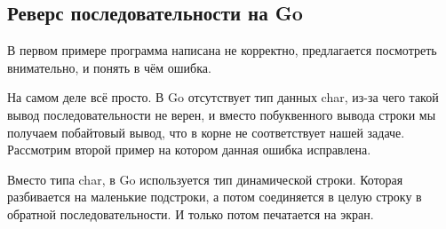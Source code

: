 \documentclass[a4paper, 12pt, titlepage, finall]{extreport}
\begin{document}
        \subsection{Реверс последовательности на Go}
            В первом примере программа написана не корректно, предлагается посмотреть внимательно, и понять в чём ошибка.
            
            
            На самом деле всё просто. В Go отсутствует тип данных char, из-за чего такой вывод последовательности не верен, и вместо
            побуквенного вывода строки мы получаем побайтовый вывод, что в корне не соответствует нашей задаче.
            Рассмотрим второй пример на котором данная ошибка исправлена.
            
            
            Вместо типа char, в Go используется тип динамической строки. Которая разбивается на маленькие подстроки, а потом соединяется в целую строку в обратной последовательности.
            И только потом печатается на экран.
\end{document}
